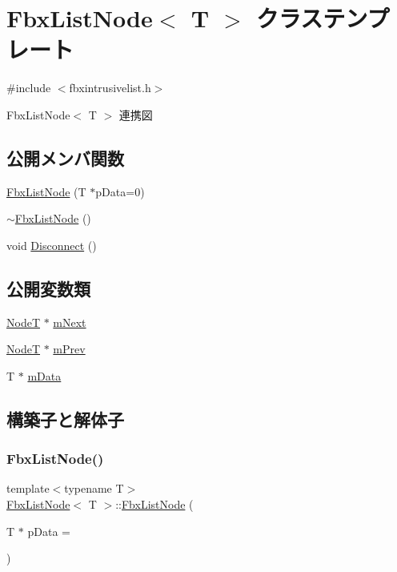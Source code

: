 \hypertarget{class_fbx_list_node}{}\section{Fbx\+List\+Node$<$ T $>$ クラステンプレート}
\label{class_fbx_list_node}


{\ttfamily \#include $<$fbxintrusivelist.\+h$>$}



Fbx\+List\+Node$<$ T $>$ 連携図
\subsection*{公開メンバ関数}
\begin{DoxyCompactItemize}
\item 
\hyperlink{class_fbx_list_node_a785e2c232e0ed056e7a028d799fd0598}{Fbx\+List\+Node} (T $\ast$p\+Data=0)
\item 
\hyperlink{class_fbx_list_node_aab6a6fce53b6e3928489c2a9eb91d7ff}{$\sim$\+Fbx\+List\+Node} ()
\item 
void \hyperlink{class_fbx_list_node_a8efc990a61791021842291e449c0c6df}{Disconnect} ()
\end{DoxyCompactItemize}
\subsection*{公開変数類}
\begin{DoxyCompactItemize}
\item 
\hyperlink{class_fbx_list_node}{NodeT} $\ast$ \hyperlink{class_fbx_list_node_ab2222766332e5adf83e11f3837258193}{m\+Next}
\item 
\hyperlink{class_fbx_list_node}{NodeT} $\ast$ \hyperlink{class_fbx_list_node_ac384122a2dbb52a949646b26db8b59fc}{m\+Prev}
\item 
T $\ast$ \hyperlink{class_fbx_list_node_a4cf8e0064fee22cafa5a3a8330777c57}{m\+Data}
\end{DoxyCompactItemize}


\subsection{構築子と解体子}
\mbox{\label{class_fbx_list_node_a785e2c232e0ed056e7a028d799fd0598}} 
\subsubsection{\texorpdfstring{Fbx\+List\+Node()}{FbxListNode()}}
{\footnotesize\ttfamily template$<$typename T$>$ \\
\hyperlink{class_fbx_list_node}{Fbx\+List\+Node}$<$ T $>$\+::\hyperlink{class_fbx_list_node}{Fbx\+List\+Node} (\begin{DoxyParamCaption}\item[{T $\ast$}]{p\+Data = {} }\end{DoxyParamCaption})\hspace{0.3cm}{\ttfamily [explicit]}}

